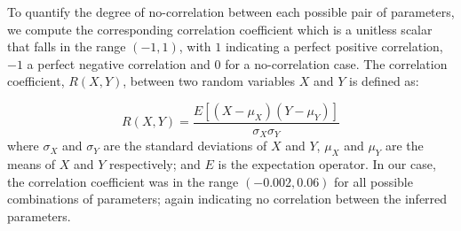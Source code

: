 To quantify the degree of no-correlation between each possible pair of parameters, we compute 
the corresponding correlation coefficient which is a unitless scalar that falls in the range 
$(-1, 1)$, with $1$ indicating a perfect positive correlation, $−1$ a perfect negative correlation and $0$ for
a no-correlation case.
The correlation coefficient, $R(X, Y )$, between two random variables $X$ and $Y$ is defined as:

\begin{equation}
R(X,Y) = \frac{E[(X - \mu_X)(Y - \mu_Y )]}{\sigma_X \sigma_Y} 
\end{equation}
where $\sigma_X$ and  $\sigma_Y$ are the standard deviations of  $X$ and $Y$, $\mu_X$
and $\mu_Y$  are the means of  $X$ and $Y$ respectively;
and $E$ is the expectation operator.  In our case, the correlation coefficient
was in the range $(-0.002 , 0.06)$ for all possible combinations of parameters; again indicating no correlation
between the inferred parameters.






